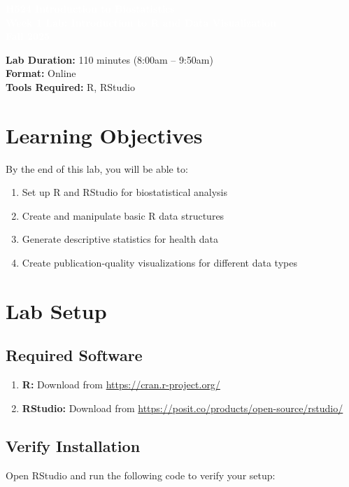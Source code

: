 \documentclass[11pt]{article}
\title{}
\author{}
\date{}
\begin{document}
\begin{tcolorbox}[colback=osaorange,colframe=black,boxrule=2pt,arc=0pt,left=3pt,right=3pt,top=6pt,bottom=6pt,boxsep=2pt]
\centering
\textcolor{white}{\textbf{\Large H524 Introduction to Biostatistics}}\\
\textcolor{white}{\textbf{\Large Week 1 Lab: Introduction to R and Data Visualization}}\\
\textcolor{white}{\textbf{\Large Fall 2025}}
\end{tcolorbox}

\vspace{8pt}

\noindent\textbf{Lab Duration:} 110 minutes (8:00am -- 9:50am)\\
\textbf{Format:} Online\\
\textbf{Tools Required:} R, RStudio

\section{Learning Objectives}

By the end of this lab, you will be able to:
\begin{enumerate}
\item Set up R and RStudio for biostatistical analysis
\item Create and manipulate basic R data structures
\item Generate descriptive statistics for health data
\item Create publication-quality visualizations for different data types
\end{enumerate}

\section{Lab Setup}

\subsection{Required Software}
\begin{enumerate}
\item \textbf{R:} Download from \url{https://cran.r-project.org/}
\item \textbf{RStudio:} Download from \url{https://posit.co/products/open-source/rstudio/}
\end{enumerate}

\subsection{Verify Installation}
Open RStudio and run the following code to verify your setup:
\end{document}
